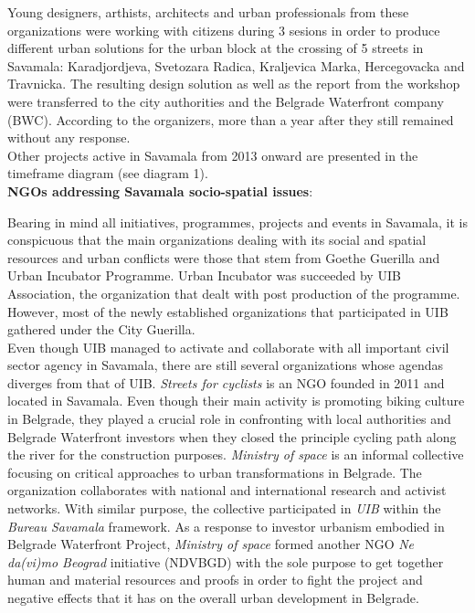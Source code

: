 \documentclass[11pt]{report}
\begin{document}
Young designers, arthists, architects and urban professionals from these organizations were working with citizens during 3 sesions in order to produce different urban solutions for the urban block at the crossing of 5 streets in Savamala: Karadjordjeva, Svetozara Radica, Kraljevica Marka, Hercegovacka and Travnicka.
The resulting design solution as well as the report from the workshop were transferred to the city authorities and the Belgrade Waterfront company (BWC). According to the organizers, more than a year after they still remained without any response.
\\
Other projects active in Savamala from 2013 onward are presented in the timeframe diagram (see diagram 1).
\\
\textbf{NGOs addressing Savamala socio-spatial issues}:

Bearing in mind all initiatives, programmes, projects and events in Savamala, it is conspicuous that the main organizations dealing with its social and spatial resources and urban conflicts were those that stem from Goethe Guerilla and Urban Incubator Programme.
Urban Incubator was succeeded by UIB  Association, the organization that dealt with post production of the programme.
However, most of the newly established organizations that participated in UIB gathered under the City Guerilla.
\\
Even though UIB managed to activate and collaborate with all important civil sector agency in Savamala, there are still several organizations whose agendas diverges from that of UIB.
\textit{Streets for cyclists} is an NGO founded in 2011 and located in Savamala.
Even though their main activity is promoting biking culture in Belgrade, they played a crucial role in confronting with local authorities and Belgrade Waterfront investors when they closed the principle cycling path along the river for the construction purposes.
\textit{Ministry of space} is an informal collective focusing on critical approaches to urban transformations in Belgrade.
The organization collaborates with national and international research and activist networks.  With similar purpose, the collective participated in \textit{UIB} within the \textit{Bureau Savamala} framework.
As a response to investor urbanism embodied in Belgrade Waterfront Project, \textit{Ministry of space} formed another NGO \textit{Ne da(vi)mo Beograd} initiative (NDVBGD) with the sole purpose to get together human and material resources and proofs in order to fight the project and negative effects that it has on the overall urban development in Belgrade.
\end{document}

